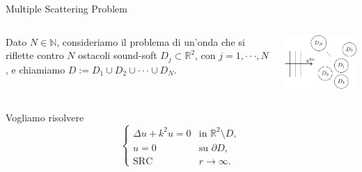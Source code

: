 \documentclass{beamer}
\newcommand{\IR}{{\mathbb R}}
\newcommand{\IN}{{\mathbb N}}
\begin{document}
	\begin{frame}{Multiple Scattering Problem}
		\begin{small}
			\begin{columns}
				\begin{column}{0.5\textwidth}
					\begin{block}{}
						Dato $N\in\IN$, consideriamo il problema di un'onda che si riflette contro $N$ ostacoli sound-soft $D_j \subset \IR^2$, con $j = 1,\cdot\cdot\cdot,N$, e chiamiamo $D:=D_1 \cup D_2 \cup \cdot\cdot\cdot \cup D_N$.
					\end{block}
				\end{column}
				\begin{column}{0.4\textwidth}
					\begin{center}
						\includegraphics[width=\textwidth]{figs/multiple.pdf}      
					\end{center}
				\end{column}
			\end{columns}
			\vspace*{0.4cm}
			Vogliamo risolvere
			\begin{equation*}
				\begin{cases}
					\Delta u + k^2 u = 0 & \text{in} \,\, \IR^2 \setminus D, \\
					u = 0  & \text{su} \,\, \partial D, \\
					\text{SRC} & r \to \infty.
				\end{cases}
			\end{equation*}
		\end{small}
	\end{frame}
	
\end{document}
